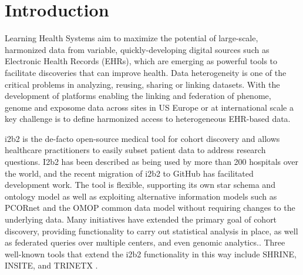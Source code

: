 \documentclass{amia}
\newcommand{\remPierre}[1]{\todo[color=green]{[PZ]{\scriptsize #1\par}}}
\newcommand{\remNico}[1]{\todo[color=orange]{[NP]{\scriptsize #1\par}}}
\begin{document}
\section*{Introduction}
Learning Health Systems aim to maximize the potential of large-scale, harmonized data from variable, quickly-developing digital sources such as Electronic Health Records (EHRs), which are emerging as powerful tools to facilitate discoveries that can improve health. Data heterogeneity is one of the critical problems in analyzing, reusing, sharing or linking datasets. With the development of platforms enabling the linking and federation of phenome, genome and exposome data across sites in US\cite{Gottesman_2013,McMurry_2013} Europe\cite{DeMoor_2015,Delaney_2015} or at international scale\cite{Hripcsak_2015} a key challenge is to define harmonized access to heterogeneous EHR-based data.

i2b2 is the de-facto open-source medical tool for cohort discovery and allows healthcare practitioners to easily subset patient data to address research questions. I2b2 has been described as being used by more than 200 hospitals\cite{pmid22081225} over the world, and the recent migration of i2b2 to GitHub has facilitated development work. The tool is flexible, supporting its own star schema and ontology model as well as exploiting alternative information models such as PCORnet\cite{Klann_2016} and the OMOP common data model\cite{i2b2-omop} without requiring changes to the underlying data. Many initiatives have extended the primary goal of cohort discovery, providing functionality to carry out statistical analysis in place, as well as federated queries over multiple centers, and even genomic analytics.\cite{Scheufele__2014,i2b2-transmart}. Three well-known tools that extend the i2b2 functionality in this way include SHRINE, INSITE, and TRINETX \cite{shrine,insite,trinetx}.   
\end{document}
